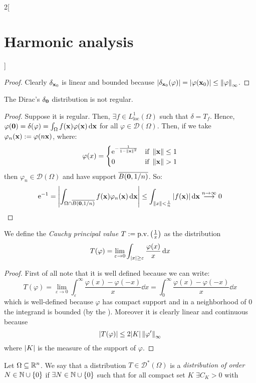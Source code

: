 \documentclass[../../../main_math.tex]{subfiles}
\begin{document}
\begin{multicols}{2}[\section{Harmonic analysis}]
\begin{proposition}
  \end{proposition}
  \begin{proof}
    Clearly $\delta_{\boldsymbol{\mathrm{x}}_0}$ is linear and bounded because $\abs{\delta_{\boldsymbol{\mathrm{x}}_0}(\varphi)}=\abs{\varphi(\boldsymbol{\mathrm{x}}_0)}\leq \left\|\varphi\right\|_\infty$.
  \end{proof}
  \begin{lemma}
    The Dirac's $\delta_{\boldsymbol{\mathrm{0}}}$ distribution is not regular.
  \end{lemma}
  \begin{proof}
    Suppose it is regular. Then, $\exists f\in L_{\mathrm{loc}}^1(\Omega)$ such that $\delta=T_f$. Hence, $\varphi(\boldsymbol{\mathrm{0}})=\delta(\varphi)=\int_\Omega f(\boldsymbol{\mathrm{x}})\varphi(\boldsymbol{\mathrm{x}})\dd{\boldsymbol{\mathrm{x}}}$ for all $\varphi\in\mathcal{D}(\Omega)$. Then, if we take $\varphi_n(\boldsymbol{\mathrm{x}}):=\varphi(n\boldsymbol{\mathrm{x}})$, where:
    $$\varphi(x)=\begin{cases}
        \exp{-\frac{1}{1-\norm{\vf{x}}^2}} & \text{if } \norm{\vf{x}}\leq 1 \\
        0                                  & \text{if } \norm{\vf{x}}> 1
      \end{cases}
    $$
    then $\varphi_n\in\mathcal{D}(\Omega)$ and have support $\overline{B(\boldsymbol{\mathrm{0}},1/n)}$. So:
    $$\mathrm{e}^{-1}=\abs{\int_{\Omega\cap \overline{B(\boldsymbol{\mathrm{0}},1/n)}} f(\boldsymbol{\mathrm{x}})\varphi_n(\boldsymbol{\mathrm{x}})\dd{\boldsymbol{\mathrm{x}}}}\leq \int_{\left\|x\right\|<\frac{1}{n}}\abs{f(\boldsymbol{\mathrm{x}})}\dd{\boldsymbol{\mathrm{x}}}\overset{n\to\infty}{\longrightarrow}0$$
  \end{proof}
  \begin{proposition}
    We define the \emph{Cauchy principal value} $T:=\mathrm{p.v.}\left(\frac{1}{x}\right)$ as the distribution
    $$T(\varphi)=\lim_{\varepsilon\to 0}\int_{\abs{x}\geq \varepsilon}\frac{\varphi(x)}{x}\dd{x}$$
  \end{proposition}
  \begin{proof}
    First of all note that it is well defined because we can write:
    $$T(\varphi)=\lim_{\varepsilon\to 0}\int_{\varepsilon}^\infty\frac{\varphi(x)-\varphi(-x)}{x}\dd{x}=\int_{0}^\infty\frac{\varphi(x)-\varphi(-x)}{x}\dd{x}$$
    which is well-defined because $\varphi$ has compact support and in a neighborhood of $0$ the integrand is bounded (by the ). Moreover it is clearly linear and continuous because $$\abs{T(\varphi)}\leq 2 \m{K} \norm{\varphi'}_\infty$$
    where $\abs{K}$ is the measure of the support of $\varphi$.
  \end{proof}
  \begin{definition}
    Let $\Omega\subseteq \mathbb{R}^n$. We say that a distribution $T\in\mathcal{D}^*(\Omega)$ is a \emph{distribution of order $N\in\mathbb{N}\cup\{0\}$} if $\exists N\in\mathbb{N}\cup\{0\}$ such that for all compact set $K$ $\exists C_K>0$ with

\end{definition}
\end{multicols}
\end{document}
